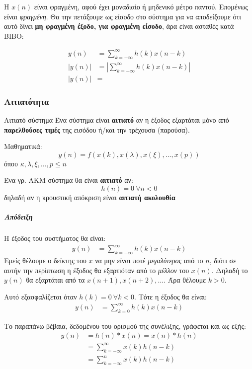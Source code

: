 \documentclass[11pt,a4paper,notitlepage,fleqn]{article}
\let\mytodo\todo
\renewcommand{\todo}[1]{\par\mytodo[inline,noline]{#1}}
\begin{document}
\begin{itemize}
	Η \( x(n) \) είναι φραγμένη, αφού έχει μοναδιαίο ή μηδενικό μέτρο παντού. Επομένως είναι \emph{φραγμένη}. Θα την πετάξουμε ως είσοδο στο σύστημα για να αποδείξουμε ότι αυτό
	δίνει \textbf{μη φραγμένη έξοδο, για φραγμένη είσοδο}, άρα είναι ασταθές κατά BIBO:
	
	\begin{align*}
		y(n) &= \sum_{k=-\infty}^{\infty} h(k)x(n-k) \\
		\left|y(n)\right| &= \left| \sum_{k=-\infty}^{\infty} h(k)x(n-k) \right|\\
		\left|y(n)\right| &= 
	\end{align*}
	
	\todo{blablabla}
\end{itemize}

\subsubsection{Αιτιατότητα}
\begin{defn}{Αιτιατό σύστημα}{}
	Ένα σύστημα είναι \textbf{αιτιατό} αν η έξοδος εξαρτάται μόνο από \textbf{παρελθούσες τιμές} της εισόδου ή/και την τρέχουσα (παρούσα).
	
	Μαθηματικά:
	\[
	y(n) = f\left( x(k),x(λ),x(ξ), \dots, x(p) \right)
	\]
	όπου \( κ,λ,ξ,\dots,p \leq n \)
\end{defn}

\begin{theorem}{}{}
	Ένα γρ. ΑΚΜ σύστημα θα είναι \textbf{αιτιατό} αν:
	\[
	h(n) = 0 \ \forall n<0
	\]
	δηλαδή αν η κρουστική απόκριση είναι \textbf{αιτιατή ακολουθία}
\end{theorem}
\subparagraph{Απόδειξη}
Η έξοδος του συστήματος θα είναι:
\begin{align*}
	y(n) &= \sum_{k=-\infty}^{\infty} h(k)x(n-k)
\end{align*}
Εμείς θέλουμε ο δείκτης του \( x \) να μην είναι ποτέ \emph{μεγαλύτερος} από το \( n \),
διότι σε αυτήν την περίπτωση η έξοδος θα εξαρτιόταν από το \emph{μέλλον} του \( x(n) \). Δηλαδή
το \( y(n) \) θα εξαρτάται από τα \( x(n+1), x(n+2), \dots \). Άρα θέλουμε \( k > 0 \).

Αυτό εξασφαλίζεται όταν \( h(k) = 0\ \forall k < 0 \). Τότε η έξοδος θα είναι:
\begin{align*}
	y(n) &= \sum_{k=0}^{\infty} h(k)x(n-k)
\end{align*}

Το παραπάνω βέβαια, δεδομένου του ορισμού της συνέλιξης, γράφεται και ως εξής:
\begin{align*}
	y(n) &= h(n) * x(n) = x(n) * h(n)
	\\ &= \sum_{k=-\infty}^{\infty}x(k)h(n-k)
	\\ &= \sum_{k=-\infty}^{n} x(k)h(n-k)
\end{align*}
\end{document}
